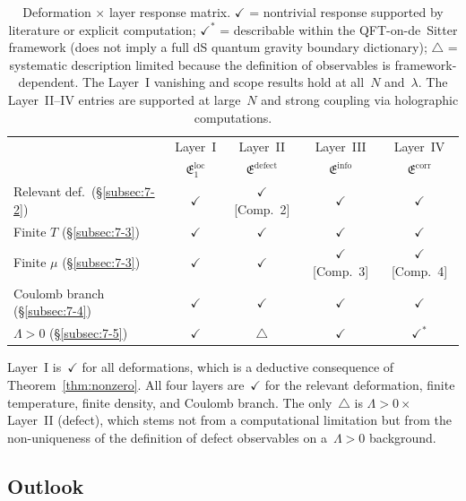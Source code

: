 \documentclass[
  aps,
  prd,
  preprint,
  groupedaddress,
  nofootinbib,
  longbibliography
]{revtex4-2}
\theoremstyle{remark}
\begin{document}
\begin{table}[h]
\caption{Deformation $\times$ layer response matrix.
  $\checkmark$ = nontrivial response supported by literature
  or explicit computation;
  $\checkmark^*$ = describable within the QFT-on-de~Sitter
  framework (does not imply a full dS quantum gravity
  boundary dictionary);
  $\triangle$ = systematic description limited because the
  definition of observables is
  framework-dependent.
  The Layer~I vanishing and scope results hold at all~$N$
  and~$\lambda$.
  The Layer~II--IV entries are supported at large~$N$ and
  strong coupling via holographic computations.}\label{tab:matrix}
\begin{ruledtabular}
\begin{tabular}{lcccc}
 & Layer~I & Layer~II & Layer~III & Layer~IV \\
 & $\mathfrak{E}_1^{\mathrm{loc}}$
 & $\mathfrak{E}^{\mathrm{defect}}$
 & $\mathfrak{E}^{\mathrm{info}}$
 & $\mathfrak{E}^{\mathrm{corr}}$\\
\colrule
Relevant def.\ (\S\ref{subsec:7-2})
  & $\checkmark$ & $\checkmark$ [Comp.~2]
  & $\checkmark$ & $\checkmark$ \\
Finite $T$ (\S\ref{subsec:7-3})
  & $\checkmark$ & $\checkmark$
  & $\checkmark$ & $\checkmark$ \\
Finite $\mu$ (\S\ref{subsec:7-3})
  & $\checkmark$ & $\checkmark$
  & $\checkmark$ [Comp.~3] & $\checkmark$ [Comp.~4] \\
Coulomb branch (\S\ref{subsec:7-4})
  & $\checkmark$ & $\checkmark$
  & $\checkmark$ & $\checkmark$ \\
$\Lambda>0$ (\S\ref{subsec:7-5})
  & $\checkmark$ & $\triangle$
  & $\checkmark$ & $\checkmark^*$ \\
\end{tabular}
\end{ruledtabular}
\end{table}

Layer~I is~$\checkmark$ for all deformations, which is a
deductive consequence of Theorem~\ref{thm:nonzero}.
All four layers are~$\checkmark$ for the relevant deformation,
finite temperature, finite density, and Coulomb branch.
The only~$\triangle$ is
$\Lambda>0\times$Layer~II (defect), which stems not from a
computational limitation but from the non-uniqueness of the
definition of defect observables on a~$\Lambda>0$ background.

\subsection{Outlook}\label{subsec:7-7}
\end{document}
